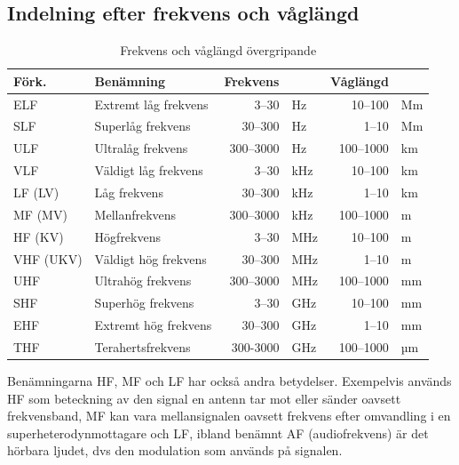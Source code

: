 \subsection{Indelning efter frekvens och våglängd}
\label{frekvens-vaglangd}
\begin{table}[H]
\centering
\begin{tabular}{llrlrl}
	\textbf{Förk.} & \textbf{Benämning}   & \textbf{Frekvens} &     & \textbf{Våglängd} &  \\ \hline
	ELF            & Extremt låg frekvens &             3--30 & Hz  &           10--100 & Mm \\
	SLF            & Superlåg frekvens    &           30--300 & Hz  &             1--10 & Mm \\
	ULF            & Ultralåg frekvens    &         300--3000 & Hz  &         100--1000 & km \\
	VLF            & Väldigt låg frekvens &             3--30 & kHz &           10--100 & km \\
	LF (LV)        & Låg frekvens         &           30--300 & kHz &             1--10 & km \\
	MF (MV)        & Mellanfrekvens       &         300--3000 & kHz &         100--1000 & m  \\
	HF (KV)        & Högfrekvens          &             3--30 & MHz &             10--100 & m  \\
	VHF (UKV)      & Väldigt hög frekvens &           30--300 & MHz &             1--10 & m  \\
	UHF            & Ultrahög frekvens    &         300--3000 & MHz &         100--1000 & mm \\
	SHF            & Superhög frekvens    &             3--30 & GHz &           10--100 & mm \\
	EHF            & Extremt hög frekvens &           30--300 & GHz &             1--10 & mm \\
	THF            & Terahertsfrekvens    &          300-3000 & GHz &         100--1000 & µm
\end{tabular}
\caption{Frekvens och våglängd övergripande}
\end{table}

Benämningarna HF, MF och LF har också andra betydelser. Exempelvis an\-vänd\-s HF som beteckning av den signal en antenn tar mot eller sänder oavsett frekvensband, MF kan vara mellansignalen oavsett frekvens efter omvandling i en superheterodynmottagare och LF, ibland benämnt AF (audiofrekvens) är det hörbara ljudet, dvs den modulation som används på signalen.

